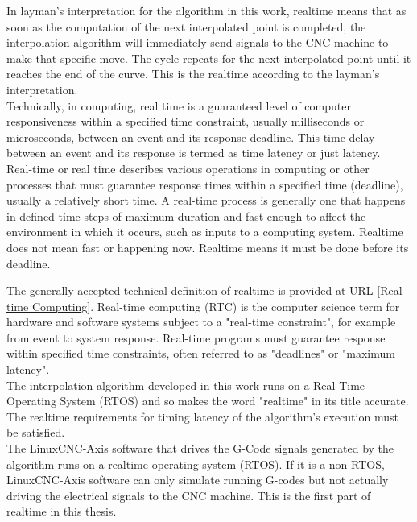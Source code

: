 In layman's interpretation for the algorithm in this work, realtime means that as soon as the computation of the next interpolated point is completed, the interpolation algorithm will immediately send signals to the CNC machine to make that specific move. The cycle repeats for the next interpolated point until it reaches the end of the curve. This is the realtime according to the layman's interpretation. \\

Technically, in computing, real time is a guaranteed level of computer responsiveness within a specified time constraint, usually milliseconds or microseconds, between an event and its response deadline. This time delay between an event and its response is termed as time latency or just latency. \\

Real-time or real time describes various operations in computing or other processes that must guarantee response times within a specified time (deadline), usually a relatively short time. A real-time process is generally one that happens in defined time steps of maximum duration and fast enough to affect the environment in which it occurs, such as inputs to a computing system. Realtime does not mean fast or happening now. Realtime means it must be done before its deadline.\\

\clearpage
\pagebreak

The generally accepted technical definition of realtime is provided at URL [\href{https://en.wikipedia.org/wiki/Real-time_computing}{Real-time Computing}]. Real-time computing (RTC) is the computer science term for hardware and software systems subject to a "real-time constraint", for example from event to system response. Real-time programs must guarantee response within specified time constraints, often referred to as "deadlines"  or "maximum latency". \\

The interpolation algorithm developed in this work runs on a Real-Time Operating System (RTOS) and so makes the word "realtime" in its title accurate. The realtime requirements for timing latency of the algorithm's execution must be satisfied. \\

The LinuxCNC-Axis software that drives the G-Code signals generated by the algorithm runs on a realtime operating system (RTOS). If it is a non-RTOS, LinuxCNC-Axis software can only simulate running G-codes but not actually driving the electrical signals to the CNC machine. This is the first part of realtime in this thesis. \\

